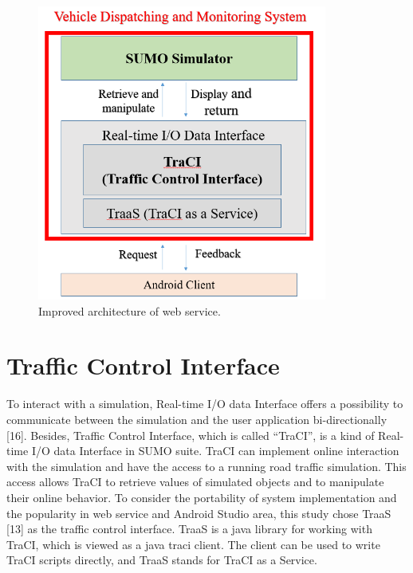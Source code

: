 \documentclass[12pt]{ksthesis}
\begin{document}
\begin{thesis}
{\begin{figure}[t!]
\centering
\includegraphics[width=0.85\textwidth]{./Thesis_figures/F4-1_webService_arcitecture.PNG}
\caption{\large Improved architecture of web service.}
\vspace{0.5cm}
\label{Fig:Improved_architecture_of_web_service}
\end{figure}



\section{Traffic Control Interface}
To interact with a simulation, Real-time I/O data Interface offers a possibility to communicate between the simulation and the user application bi-directionally [16]. Besides, Traffic Control Interface, which is called “TraCI”, is a kind of Real-time I/O data Interface in SUMO suite.
TraCI can implement online interaction with the simulation and have the access to a running road traffic simulation. This access allows TraCI to retrieve values of simulated objects and to manipulate their online behavior.
To consider the portability of system implementation and the popularity in web service and Android Studio area, this study chose TraaS [13] as the traffic control interface. TraaS is a java library for working with TraCI, which is viewed as a java traci client. The client can be used to write TraCI scripts directly, and TraaS stands for TraCI as a Service.

}
\end{thesis}
\end{document}
